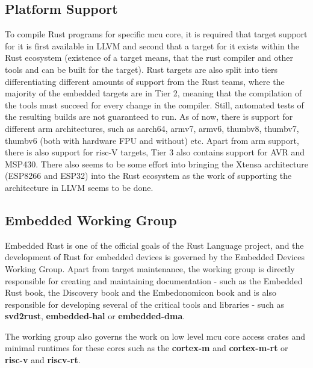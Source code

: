 \subsection{Platform Support}
\label{subsec:platform_support}
To compile Rust programs for specific \acs{mcu} core, it is required that target support for it is first available in LLVM and second that a target for it exists within the Rust ecosystem (existence of a target means, that the rust compiler and other tools and can be built for the target).
Rust targets are also split into tiers differentiating different amounts of support from the Rust teams, where the majority of the embedded targets are in Tier 2, meaning that the compilation of the tools must succeed for every change in the compiler.
Still, automated tests of the resulting builds are not guaranteed to run.
As of now, there is support for different \acs{arm} architectures, such as aarch64, armv7, armv6, thumbv8, thumbv7, thumbv6 (both with hardware FPU and without) etc\cite{noauthor_platform_nodate}.
Apart from \acs{arm} support, there is also support for \acs{risc}-V targets, Tier 3 also contains support for AVR\cite{noauthor_platform_nodate, rahul_how_nodate} and MSP430.
There also seems to be some effort into bringing the Xtensa architecture (ESP8266 and ESP32)\cite{mabin_mabezdevxtensa-rust-quickstart_2021} into the Rust ecosystem as the work of supporting the architecture in LLVM seems to be done.

\subsection{Embedded Working Group}
\label{subsec:embedded_wg}
Embedded Rust is one of the official goals of the Rust Language project, and the development of Rust for embedded devices is governed by the Embedded Devices Working Group\cite{noauthor_embedded_nodate}.
Apart from target maintenance, the working group is directly responsible for creating and maintaining documentation - such as the Embedded Rust book\cite{rust_embedded_devices_wg_introduction_2021}, the Discovery book\cite{rust_embedded_devices_wg_introduction_nodate} and the Embedonomicon book\cite{rust_embedded_devices_wg_preface_nodate} and is also responsible for developing several of the critical tools and libraries - such as \textbf{svd2rust}, \textbf{embedded-hal} or \textbf{embedded-dma}.

The working group also governs the work on low level \acs{mcu} core access crates and minimal runtimes for these cores such as the \textbf{cortex-m} and \textbf{cortex-m-rt} or \textbf{risc-v} and \textbf{riscv-rt}.

